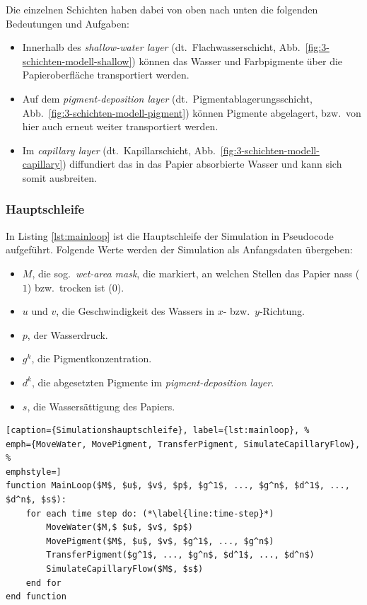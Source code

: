 Die einzelnen Schichten haben dabei von oben nach unten die folgenden Bedeutungen
und Aufgaben:

\begin{itemize}
  \item Innerhalb des \textsl{shallow-water layer} (dt.\ Flachwasserschicht, 
  Abb.\ \ref{fig:3-schichten-modell-shallow}) können das Wasser und 
  Farbpigmente über die Papieroberfläche transportiert werden.
  \item Auf dem \textsl{pigment-deposition layer} (dt.\ 
  Pigmentablagerungsschicht, Abb.\ \ref{fig:3-schichten-modell-pigment}) 
  können Pigmente abgelagert, bzw.\ von hier auch erneut weiter transportiert 
  werden.
  \item Im \textsl{capillary layer} (dt.\ Kapillarschicht, Abb.\ 
  \ref{fig:3-schichten-modell-capillary}) diffundiert das in das Papier 
  absorbierte Wasser und kann sich somit ausbreiten.
\end{itemize}

\subsubsection{Hauptschleife}
In Listing \ref{lst:mainloop} ist die Hauptschleife der Simulation in 
Pseudocode aufgeführt. Folgende Werte werden der Simulation als Anfangsdaten
übergeben: 

\begin{itemize}
  \item $M$, die sog.\ \textsl{wet-area mask}, die markiert, an welchen Stellen
  das Papier nass ($1$) bzw.\ trocken ist ($0$).
  \item $u$ und $v$, die Geschwindigkeit des Wassers in $x$- bzw.\ $y$-Richtung.
  \item $p$, der Wasserdruck.
  \item $g^k$, die Pigmentkonzentration.
  \item $d^k$, die abgesetzten Pigmente im \textsl{pigment-deposition layer}.
  \item $s$, die Wassersättigung des Papiers.
\end{itemize}

\begin{lstlisting}[caption={Simulationshauptschleife}, label={lst:mainloop}, %
emph={MoveWater, MovePigment, TransferPigment, SimulateCapillaryFlow}, %
emphstyle=]
function MainLoop($M$, $u$, $v$, $p$, $g^1$, ..., $g^n$, $d^1$, ..., $d^n$, $s$):
	for each time step do: (*\label{line:time-step}*)
		MoveWater($M,$ $u$, $v$, $p$)
		MovePigment($M$, $u$, $v$, $g^1$, ..., $g^n$)
		TransferPigment($g^1$, ..., $g^n$, $d^1$, ..., $d^n$)
		SimulateCapillaryFlow($M$, $s$)
	end for
end function
\end{lstlisting}

